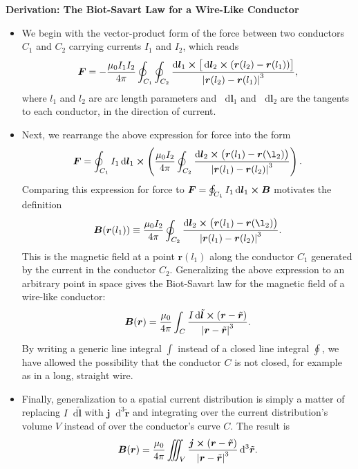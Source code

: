 \documentclass[11pt, a4paper]{article}
\newcommand{\diff}{\mathop{}\!\mathrm{d}} %
\newcommand{\dtr}{\diff^{3} \tilde{\r}}  %
\renewcommand{\vec}[1]{\bm{#1}} %
\renewcommand{\r}{\vec{r}}
\newcommand{\B}{\vec{B}} %
\newcommand{\mm}{\mu_{0}}  %
\renewcommand{\j}{\vec{j}}  %
\begin{document}
\textbf{Derivation: The Biot-Savart Law for a Wire-Like Conductor}
\begin{itemize}
	
	\item We begin with the vector-product form of the force between two conductors $ C_{1} $ and $ C_{2} $ carrying currents $ I_{1} $ and $ I_{2} $, which reads
	\begin{equation*}
		\vec{F} = - \frac{\mm I_{1}I_{2}}{4\pi}\oint_{C_{1}}\oint_{C_{2}} \frac{\diff \vec{l}_{1}\cross \big[\diff \vec{l}_{2} \cross (\r(l_{2}) - \r(l_{1}) )\big]}{\abs{\r(l_{2}) - \r(l_{1})}^{3}},
	\end{equation*}
    where $ l_{1} $ and $ l_{2} $ are arc length parameters and $ \diff \vec{l}_{1} $ and $ \diff \vec{l}_{2} $ are the tangents to each conductor, in the direction of current. 

    \item Next, we rearrange the above expression for force into the form
	\begin{equation*}
		\vec{F} = \oint_{C_{1}}I_{1}\diff \vec{l}_{1}\cross \left(\frac{\mm I_{2}}{4\pi} \oint_{C_{2}}\frac{\diff \vec{l}_{2} \cross \big(\r(l_{1}) - \r(\l_{2})\big)}{\abs{\r(l_{1}) - \r(l_{2})}^{3}}\right).
	\end{equation*}
	Comparing this expression for force to $ \vec{F} = \oint_{C_{1}} I_{1} \diff \vec{l}_{1} \cross \B $ motivates the definition
	\begin{equation*}
		\B(\r(l_{1})) \equiv \frac{\mm I_{2}}{4\pi} \oint_{C_{2}}\frac{\diff \vec{l}_{2} \cross \big(\r(l_{1}) - \r(\l_{2})\big)}{\abs{\r(l_{1}) - \r(l_{2})}^{3}}.
	\end{equation*}
    This is the magnetic field at a point $ \r(l_{1}) $ along the conductor $ C_{1} $ generated by the current in the conductor $ C_{2} $. Generalizing the above expression to an arbitrary point in space gives the Biot-Savart law for the magnetic field of a wire-like conductor:
    \begin{equation*}
        \B(\r) = \frac{\mm}{4\pi} \int_{C} \frac{I \diff \tilde{\vec{l}} \cross (\r - \tilde{\r})}{\abs{\r - \tilde{\r}}^{3}}.
    \end{equation*}
    By writing a generic line integral $ \int $ instead of a closed line integral $ \oint $, we have allowed the possibility that the conductor $ C $ is not closed, for example as in a long, straight wire.

    \item Finally, generalization to a spatial current distribution is simply a matter of replacing $ I \diff \tilde{\vec{l}} $ with $ \j \dtr $ and integrating over the current distribution's volume $ V $ instead of over the conductor's curve $ C $. The result is
    \begin{equation*}
        \B(\r) = \frac{\mm}{4 \pi} \iiint_{V} \frac{\j \cross (\r - \tilde{\r})}{\abs{\r - \tilde{\r}}^{3}} \dtr.
    \end{equation*}

\end{itemize}
	
\end{document}
